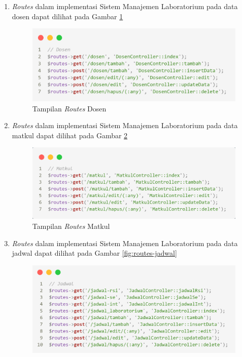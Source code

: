 \begin{enumerate}
	\item \textit{Routes} dalam implementasi Sistem Manajemen Laboratorium pada data dosen dapat dilihat pada Gambar \ref{fig:routes-dosen}
	      \begin{figure}
		      \centering
		      \includegraphics[width=0.82\linewidth]{konten//gambar/routes/dosen.png}
		      \caption{Tampilan \textit{Routes} Dosen}
		      \label{fig:routes-dosen}
	      \end{figure}
	\item \textit{Routes} dalam implementasi Sistem Manajemen Laboratorium pada data matkul dapat dilihat pada Gambar \ref{fig:routes-matkul}
	      \begin{figure}
		      \centering
		      \includegraphics[width=0.82\linewidth]{konten//gambar/routes/matkul.png}
		      \caption{Tampilan \textit{Routes} Matkul}
		      \label{fig:routes-matkul}
	      \end{figure}
	\item \textit{Routes} dalam implementasi Sistem Manajemen Laboratorium pada data jadwal dapat dilihat pada Gambar \ref{fig:routes-jadwal}
	      \begin{figure}
		      \centering
		      \includegraphics[width=0.82\linewidth]{konten//gambar/routes/jadwal.png}

\end{figure}
\end{enumerate}
